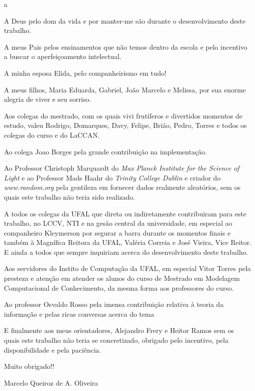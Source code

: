 a\documentclass[tcc]{ic}
\begin{document}
\begin{agradecimentos}
\noindent

A Deus pelo dom da vida e por manter-me são durante o desenvolvimento deste trabalho.

A meus Pais pelos ensinamentos que não temos dentro da escola e pelo incentivo a buscar o aperfeiçoamento intelectual.

A minha esposa Elida, pelo companheirismo em tudo!

A meus filhos, Maria Eduarda, Gabriel, João Marcelo e Melissa, por sua enorme alegria de viver e seu sorriso.

Aos colegas do mestrado, com os quais vivi frutíferos e divertidos momentos de estudo, valeu Rodrigo, Domarques, Davy, 
Felipe, Brião, Pedro, Torres e todos os colegas do curso e do LaCCAN.

Ao colega Joao Borges pela grande contribuição na implementação.

Ao Professor Christoph Marquardt do \textit{Max Planck Institute for the Science of Light} e ao Professor Mads Haahr do \textit{Trinity College Dublin} e criador do \textit{www.random.org} pela gentileza em fornecer dados realmente aleatórios, sem os quais este trabalho não teria sido realizado.

A todos os colegas da UFAL que direta ou indiretamente contribuiram para este trabalho, no LCCV, NTI e na gesão central da universidade, em especial ao companheiro Kleymerson por segurar a barra durante os momentos finais e também à Magnífica Reitora da UFAL, Valéria Correia e José Vieira, Vice Reitor. E ainda a todos que sempre inquiriam acerca do desenvolvimento deste trabalho.

Aos servidores do Instito de Computação da UFAL, em especial Vitor Torres pela presteza e atenção em atender os alunos do curso de Mestrado em Modelagem Computacional de Conhecimento, da mesma forma aos professores do curso.

Ao professor Osvaldo Rosso pela imensa contribuição relativa à teoria da informação e pelas ricas conversas acerca do tema

E finalmente aos meus orientadores, Alejandro Frery e Heitor Ramos sem os quais este trabalho não teria se concretizado, obrigado pelo incentivo, pela disponibilidade e pela paciência. 

Muito obrigado!!

\vspace{1em}
\begin{flushright}
Marcelo Queiroz de A. Oliveira
\end{flushright}
\end{agradecimentos}
\end{document}
